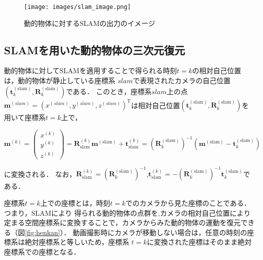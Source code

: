 \begin{comment}
\begin{figure}[h]
	\centering
	\texttt{[image: images/slam.png]}
	\caption{動的物体に対するSLAMの出力と座標変換．回転する立方体を撮影した場合．}
	\label{fig:dynamic_slam}
\end{figure}
\end{comment}

\begin{figure}[h]
	\centering
	\texttt{[image: images/slam\_image.png]}
	\caption{動的物体に対するSLAMの出力のイメージ}
	\label{fig:dynamic_slam}
\end{figure}

\subsection{SLAMを用いた動的物体の三次元復元}\label{subsec:3Dreconstruction}
動的物体に対してSLAMを適用することで得られる時刻$t=k$の相対自己位置は，動的物体が静止している座標系 $slam$で表現されたカメラの自己位置 $(\mathbf{t}^{(\text{slam})}_k,\mathbf{R}^{(\text{slam})}_k)$である．
このとき，座標系$slam$上の点$\mathbf{m}^{(slam)}={(x^{(slam)} , y^{(slam)} , z^{(slam)} )}^\mathrm{T}$は相対自己位置$(\mathbf{t}^{(\text{slam})}_k,\mathbf{R}^{(\text{slam})}_k)$を用いて座標系$t=k$上で，

\begin{equation}\label{eq:trans2}
	\mathbf{m}^{(k)}
	=
	\left(\begin{array}{c}
		x^{(k)} \\ y^{(k)} \\ z^{(k)}
	\end{array}
	\right)
	=
	\mathbf{R}^{(k)}_{\text{slam}}\mathbf{m}^{({\text{slam}})}
	+\mathbf{t}^{(k)}_{\text{slam}} 
	=
	(\mathbf{R}^{(\text{slam})}_{k})^{-1}(\mathbf{m}^{({\text{slam}})}-\mathbf{t}^{(\text{slam})}_{k})
\end{equation}

に変換される．
なお，$\mathbf{R}^{(k)}_{\text{slam}}=(\mathbf{R}^{(\text{slam})}_{k})^{-1}$,$\mathbf{t}^{(k)}_{\text{slam}} =-(\mathbf{R}^{(\text{slam})}_{k})^{-1}\mathbf{t}^{(\text{slam})}_{k}$である．

座標系$t=k$上での座標とは，時刻$t=k$でのカメラから見た座標のことである．
つまり，SLAMにより 得られる動的物体の点群を,カメラの相対自己位置により定まる空間座標系に変換することで，カメラからみた動的物体の運動を復元できる（図\ref{fig:henkan}）．
動画撮影時にカメラが移動しない場合は，任意の時刻の座標系は絶対座標系と等しいため，座標系 $t=k$に変換された座標はそのまま絶対座標系での座標となる．
\begin{comment}
動画においてカメラが移動していた場合は，座標系$t=k$上に変換された座標を絶対座標系で表現することで，絶対座標系における動的物体の点群が復元できる．
\end{comment}

